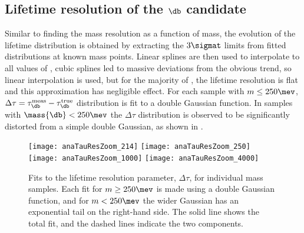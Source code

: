 

\subsection[Lifetime resolution of the \db candidate]
{Lifetime resolution of the $\boldsymbol{\db}$ candidate}
Similar to finding the mass resolution as a function of mass, the evolution of the lifetime
distribution is obtained by extracting the $3\sigmat$ limits from fitted distributions at known \db
mass points.
Linear splines are then used to interpolate to all values of \mass{\db}, cubic splines led to
massive deviations from the obvious trend, so linear interpolation is used, but for the majority of
\mass{\dm}, the lifetime resolution is flat and this approximation has negligible effect.
For each \btokstrdb sample with $m\leq250\mev$,
$\Delta\tau=\tau^\mathrm{meas}_{\db}-\tau^\mathrm{true}_{\db}$ distribution is fit to a double
Gaussian function.
In samples with $\mass{\db}<250\mev$ the $\Delta\tau$ distribution is observed to be significantly
distorted from a simple double Gaussian, as shown in .

\begin{figure}
  \begin{center}
    \texttt{[image: anaTauResZoom\_214]}
    \texttt{[image: anaTauResZoom\_250]}
    \texttt{[image: anaTauResZoom\_1000]}
    \texttt{[image: anaTauResZoom\_4000]}
  \end{center}
  \caption[Fits to the lifetime resolution for simulated ]
  {
    Fits to the lifetime resolution parameter, $\Delta\tau$, for individual mass samples.
    Each fit for $m\geq250\mev$ is made using a double Gaussian function, and for $m<250\mev$ the
    wider Gaussian has an exponential tail on the right-hand side.
    The solid line shows the total fit, and the dashed lines indicate the two components.
  }
  \label{fig:taures:zoom}
\end{figure}


